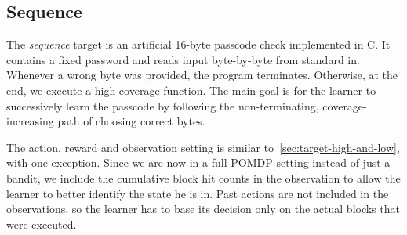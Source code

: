 
\subsection{Sequence}\label{sec:target-sequence}

The \emph{sequence} target is an artificial 16-byte passcode check implemented in C.
It contains a fixed password and reads input byte-by-byte from standard in.
Whenever a wrong byte was provided, the program terminates.
Otherwise, at the end, we execute a high-coverage function.
The main goal is for the learner to successively learn the passcode by following
the non-terminating, coverage-increasing path of choosing correct bytes.

The action, reward and observation setting is similar to~\cref{sec:target-high-and-low}, with
one exception.
Since we are now in a full POMDP setting instead of just a bandit, we include
the cumulative block hit counts in the observation to allow the learner to better identify
the state he is in.
Past actions are not included in the observations, so the learner has to base its
decision only on the actual blocks that were executed.

